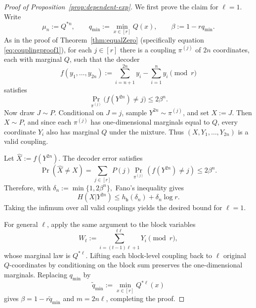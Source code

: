 \documentclass[journal]{IEEEtran}
\newcommand{\1}{\mathbf{1}}
\begin{document}
\begin{proof}[Proof of Proposition~\ref{prop:dependent-exp}]
We first prove the claim for $\ell=1$. Write
\[
\mu_n:=Q^{*n},
\qquad
q_{\min}:=\min_{x\in[r]}Q(x),
\qquad
\beta:=1-rq_{\min}.
\]
As in the proof of Theorem~\ref{thm:equalZero} (specifically equation \eqref{eq:couplingproof1}), for each $j\in[r]$ there is a
coupling $\pi^{(j)}$ of $2n$ coordinates, each with marginal $Q$, such that
the decoder
\[
f(y_1,\ldots,y_{2n})
:=
\sum_{i=n+1}^{2n}y_i-\sum_{i=1}^n y_i
\pmod r
\]
satisfies
\[\Pr_{\pi^{(j)}}\bigl(f(Y^{2n})\neq j\bigr)\le2\beta^n .\]
Now draw $J\sim P$. Conditional on $J=j$, sample
$Y^{2n}\sim \pi^{(j)}$, and set $X:=J$. Then $X\sim P$, and since each
$\pi^{(j)}$ has one-dimensional marginals equal to $Q$, every coordinate
$Y_i$ also has marginal $Q$ under the mixture. Thus
$(X,Y_1,\ldots,Y_{2n})$ is a valid coupling.

Let $\widehat X:=f(Y^{2n})$. The decoder error satisfies
\[
\Pr(\widehat X\neq X)
=
\sum_{j\in[r]}P(j)\Pr_{\pi^{(j)}}(f(Y^{2n})\neq j)
\le
2\beta^n .
\]
Therefore, with
\(\delta_n:=\min\{1,2\beta^n\},\)
Fano's inequality gives
\[
H(X| Y^{2n})
\le
h_{\mathsf b}(\delta_n)+\delta_n\log r .
\]
Taking the infimum over all valid couplings yields the desired bound for
$\ell=1$.

For general $\ell$, apply the same argument to the block variables
\[
W_t:=\sum_{i=(t-1)\ell+1}^{t\ell}Y_i \pmod r,
\]
whose marginal law is $Q^{*\ell}$. Lifting each block-level coupling back to
$\ell$ original $Q$-coordinates by conditioning on the block sum preserves the
one-dimensional marginals. Replacing $q_{\min}$ by
\[
\widetilde q_{\min}:=\min_{x\in[r]}Q^{*\ell}(x)
\]
gives $\beta=1-r\widetilde q_{\min}$ and $m=2n\ell$, completing the proof.
\end{proof}
\end{document}
